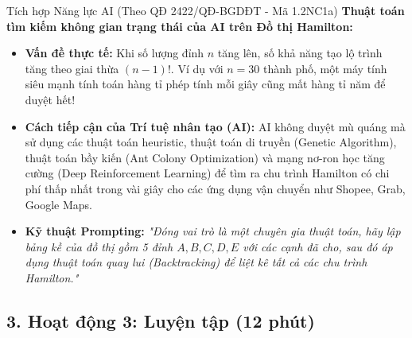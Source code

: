 \documentclass[12pt, a4paper]{article}
\begin{document}
\begin{aibox}{Tích hợp Năng lực AI (Theo QĐ 2422/QĐ-BGDĐT - Mã 1.2NC1a)}
    \textbf{Thuật toán tìm kiếm không gian trạng thái của AI trên Đồ thị Hamilton:}
    \begin{itemize}[leftmargin=0.6cm]
        \item \textbf{Vấn đề thực tế:} Khi số lượng đỉnh $n$ tăng lên, số khả năng tạo lộ trình tăng theo giai thừa $(n-1)!$. Ví dụ với $n = 30$ thành phố, một máy tính siêu mạnh tính toán hàng tỉ phép tính mỗi giây cũng mất hàng tỉ năm để duyệt hết!
        \item \textbf{Cách tiếp cận của Trí tuệ nhân tạo (AI):} AI không duyệt mù quáng mà sử dụng các thuật toán heuristic, thuật toán di truyền (Genetic Algorithm), thuật toán bầy kiến (Ant Colony Optimization) và mạng nơ-ron học tăng cường (Deep Reinforcement Learning) để tìm ra chu trình Hamilton có chi phí thấp nhất trong vài giây cho các ứng dụng vận chuyển như Shopee, Grab, Google Maps.
        \item \textbf{Kỹ thuật Prompting:} \textit{"Đóng vai trò là một chuyên gia thuật toán, hãy lập bảng kề của đồ thị gồm 5 đỉnh $A, B, C, D, E$ với các cạnh đã cho, sau đó áp dụng thuật toán quay lui (Backtracking) để liệt kê tất cả các chu trình Hamilton."}
    \end{itemize}
\end{aibox}

\subsection*{3. Hoạt động 3: Luyện tập (12 phút)}
\end{document}
